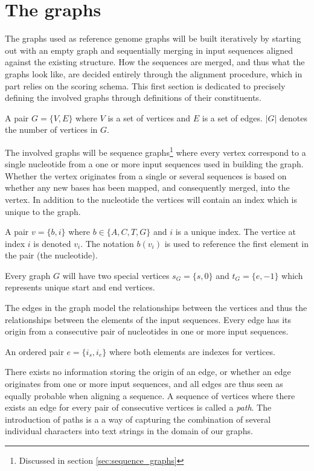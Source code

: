 \documentclass[thesis.tex]{subfiles}
\begin{document}
{\section{The graphs}
The graphs used as reference genome graphs will be built iteratively by starting out with an empty graph and sequentially merging in input sequences aligned against the existing structure. How the sequences are merged, and thus what the graphs look like, are decided entirely through the alignment procedure, which in part relies on the scoring schema. This first section is dedicated to precisely defining the involved graphs through definitions of their constituents. 
\clearpage
\begin{defn}
  A pair $G=\{V,E\}$ where $V$ is a set of vertices and $E$ is a set of edges. $|G|$ denotes the number of vertices in $G$.
\end{defn}
The involved graphs will be sequence graphs\footnote{Discussed in section \ref{sec:sequence_graphs}} where every vertex correspond to a single nucleotide from a one or more input sequences used in building the graph. Whether the vertex originates from a single or several sequences is based on whether any new bases has been mapped, and consequently merged, into the vertex. In addition to the nucleotide the vertices will contain an index which is unique to the graph. 
\begin{defn}
  A pair $v=\{b, i\}$ where $b \in \{A, C, T, G\}$ and $i$ is a unique index. The vertice at index $i$ is denoted $v_i$. The notation $b(v_i)$ is used to reference the first element in the pair (the nucleotide).
\end{defn}
Every graph $G$ will have two special vertices $s_G=\{s, 0\}$ and $t_G=\{e, -1\}$ which represents unique start and end vertices.\\
\par\noindent
The edges in the graph model the relationships between the vertices and thus the relationships between the elements of the input sequences. Every edge has its origin from a consecutive pair of nucleotides in one or more input sequences.
\begin{defn}
  An ordered pair $e=\{i_s, i_e\}$ where both elements are indexes for vertices. 
\end{defn}
There exists no information storing the origin of an edge, or whether an edge originates from one or more input sequences, and all edges are thus seen as equally probable when aligning a sequence. A sequence of vertices where there exists an edge for every pair of consecutive vertices is called a \textit{path}. The introduction of paths is a a way of capturing the combination of several individual characters into text strings in the domain of our graphs.
}
\end{document}
